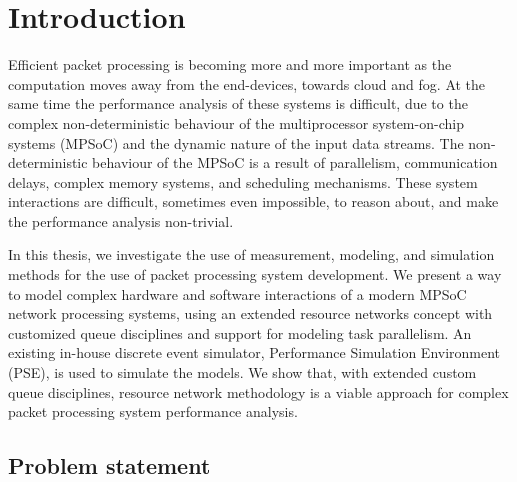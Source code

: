 \chapter{Introduction}
\label{chapter:intro}
Efficient packet processing is becoming more and more important as the computation moves away from the end-devices, towards cloud and fog. At the same time the performance analysis of these systems is difficult, due to the complex non-deterministic behaviour of the multiprocessor system-on-chip systems (MPSoC) and the dynamic nature of the input data streams. The non-deterministic behaviour of the MPSoC is a result of parallelism, communication delays, complex memory systems, and scheduling mechanisms. These system interactions are difficult, sometimes even impossible, to reason about, and make the performance analysis non-trivial.

In this thesis, we investigate the use of measurement, modeling, and simulation methods for the use of packet processing system development. We present a way to model complex hardware and software interactions of a modern MPSoC network processing systems, using an extended resource networks concept with customized queue disciplines and support for modeling task parallelism. An existing in-house discrete event simulator, Performance Simulation Environment (PSE), is used to simulate the models. We show that, with extended custom queue disciplines, resource network methodology is a viable approach for complex packet processing system performance analysis.



\section{Problem statement}




